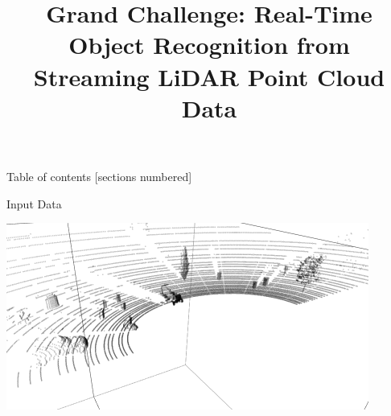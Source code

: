 \documentclass[9pt]{beamer}
\title[Real-Time Object Recognition from Streaming LiDAR Point Cloud Data]{Grand Challenge: Real-Time Object Recognition 
from Streaming LiDAR Point Cloud Data}
\begin{document}







\maketitle






\begin{frame}{Table of contents}
 [sections numbered]
   \tableofcontents[hideallsubsections]


\end{frame}





\begin{frame}[fragile]{Input Data }


		\centering
		\includegraphics[width=\textwidth]{./images/lidar-3d-view.png}
	

\end{frame}
\end{document}
